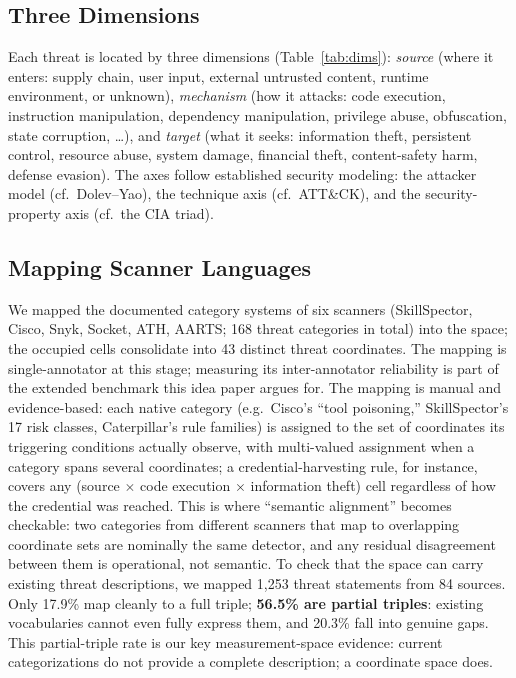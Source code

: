 \documentclass[sigconf,nonacm]{acmart}
\begin{document}
\subsection{Three Dimensions}
Each threat is located by three dimensions (Table~\ref{tab:dims}): \emph{source} (where it enters: supply chain, user input, external untrusted content, runtime environment, or unknown), \emph{mechanism} (how it attacks: code execution, instruction manipulation, dependency manipulation, privilege abuse, obfuscation, state corruption, \ldots), and \emph{target} (what it seeks: information theft, persistent control, resource abuse, system damage, financial theft, content-safety harm, defense evasion). The axes follow established security modeling: the attacker model (cf.\ Dolev--Yao), the technique axis (cf.\ ATT\&CK), and the security-property axis (cf.\ the CIA triad).

\subsection{Mapping Scanner Languages}
We mapped the documented category systems of six scanners (SkillSpector, Cisco, Snyk, Socket, ATH, AARTS; 168 threat categories in total) into the space; the occupied cells consolidate into 43 distinct threat coordinates. The mapping is single-annotator at this stage; measuring its inter-annotator reliability is part of the extended benchmark this idea paper argues for. The mapping is manual and evidence-based: each native category (e.g.\ Cisco's ``tool poisoning,'' SkillSpector's 17 risk classes, Caterpillar's rule families) is assigned to the set of coordinates its triggering conditions actually observe, with multi-valued assignment when a category spans several coordinates; a credential-harvesting rule, for instance, covers any (source $\times$ code execution $\times$ information theft) cell regardless of how the credential was reached. This is where ``semantic alignment'' becomes checkable: two categories from different scanners that map to overlapping coordinate sets are nominally the same detector, and any residual disagreement between them is operational, not semantic. To check that the space can carry existing threat descriptions, we mapped 1{,}253 threat statements from 84 sources. Only 17.9\% map cleanly to a full triple; \textbf{56.5\% are partial triples}: existing vocabularies cannot even fully express them, and 20.3\% fall into genuine gaps. This partial-triple rate is our key measurement-space evidence: current categorizations do not provide a complete description; a coordinate space does.
\end{document}
